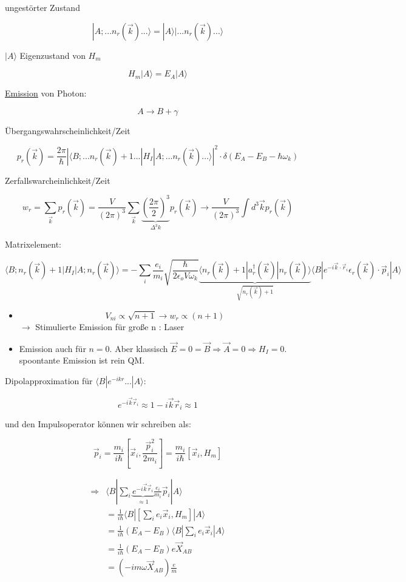 ungestörter Zustand

\[|A;...n_r(\vec k) ...\rangle  = |A\rangle |...n_r(\vec k)...\rangle \]


\(|A\rangle \) Eigenzustand von \(H_m\)

\[H_m|A\rangle  = E_A|A\rangle \]

\underline{Emission} von Photon:

\[A\rightarrow B+\gamma\]

Übergangswahrscheinlichkeit/Zeit

\[p_r(\vec k) = \frac{2\pi}{\hbar}|\langle B;...n_r(\vec k)+1...|H_I|A;...n_r(\vec k)...\rangle |^2\cdot\delta(E_A-E_B-\hbar\omega_k)\]

Zerfallswarcheinlichkeit/Zeit

\[w_r = \sum_{\vec k}p_r(\vec k) = \frac{V}{(2\pi)^3}\sum_{\vec k}\underbrace{(\frac{2\pi}{2})^3}_{\Delta^3k}p_r(\vec k)\rightarrow \frac{V}{(2\pi)^3}\int d^3\vec k p_r(\vec k)\]

Matrixelement:

\[\langle B;n_r(\vec k) +1 |H_I|A;n_r(\vec k)\rangle = -\sum_i \frac{e_i}{m_i}\sqrt{\frac{\hbar}{2\epsilon_o V\omega_k}}\underbrace{\langle n_r(\vec k) +1 |a^\dagger_r(\vec k)|n_r(\vec k)\rangle }_{\sqrt{n_r(\vec k)+1}} \langle B|e^{-i\vec k\cdot\vec r_i}\epsilon_r(\vec k)\cdot \vec p_i|A\rangle \]


\begin{itemize}
\item 
\[V_{ni}\propto \sqrt{n+1} \rightarrow w_r\propto (n+1)\]
\(\rightarrow \) Stimulierte Emission für große n : Laser

\item Emission auch für \(n=0\). Aber klassisch \(\vec E = 0=\vec B \Rightarrow \vec A=0\Rightarrow H_I=0\). spoontante Emission ist rein QM.

\end{itemize}


Dipolapproximation für \(\langle B|e^{-ikr}...|A\rangle \):

\[e^{-i\vec k\vec r_i}\approx 1-i\vec k\vec r_i\approx 1\]

und den Impulsoperator können wir schreiben als:

\[\vec p_i = \frac{m_i}{i\hbar} [\vec x_i,\frac{\vec p_i^2}{2m_i}] = \frac{m_i}{i\hbar} [\vec x_i,H_m]  \]


\begin{align}
\Rightarrow &\langle B|\sum_i \underbrace{e^{-i\vec k\vec r_i}}_{\approx 1} \frac{e_i}{m_i}\vec p_i|A\rangle \\
&=\frac{1}{i\hbar} \langle B|[\sum_i e_i \vec x_i,H_m] |A\rangle \\
&=\frac{1}{i\hbar} (E_A-E_B) \langle B|\sum_i e_i\vec x_i|A\rangle\\
&=\frac{1}{i\hbar} (E_A-E_B) e\vec X_{AB}\\
&= (-im\omega \vec X_{AB})\frac{e}{m}
\end{align}


